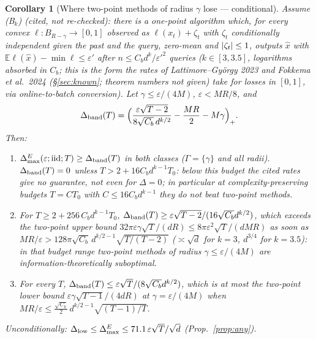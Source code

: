 \documentclass[11pt,a4paper]{article}
\numberwithin{equation}{section}
\newtheorem{corollary}[theorem]{Corollary}
\theoremstyle{definition}
\theoremstyle{remark}
\newcommand{\E}{\mathbb E}\newcommand{\R}{\mathbb R}\newcommand{\Z}{\mathbb Z}\newcommand{\Prob}{\mathbb P}
\newcommand{\Dmax}{\Delta_{\max}}\newcommand{\Dcp}{\Delta_{\rm cp}}\newcommand{\Dlow}{\Delta_{\rm low}}
\begin{document}
\begin{corollary}[Where two-point methods of radius $\gamma$ lose --- conditional]\label{cor:cross}
\emph{Assume} (B$_{k}$) (cited, not re-checked): there is a one-point algorithm which, for every convex $\ell:B_{R-\gamma}\to[0,1]$ observed as $\ell(x_t)+\zeta_t$ with $\zeta_t$ conditionally independent given the past and the query, zero-mean and $\lvert \zeta_t\rvert\le1$, outputs $\hat x$ with $\E\ell(\hat x)-\min\ell\le\varepsilon'$ after $n\le C_bd^k/\varepsilon'^2$ queries ($k\in[3,3.5]$, logarithms absorbed in $C_b$; this is the form the rates of Lattimore--Gy\"orgy 2023 and Fokkema et al.\ 2024 (\S\ref{sec:known}; theorem numbers not given) take for losses in $[0,1]$, via online-to-batch conversion). Let $\gamma\le\varepsilon/(4M)$, $\varepsilon<MR/8$, and
\[
\Delta_{\rm band}(T)=\Big(\frac{\varepsilon\sqrt{T-2}}{8\sqrt{C_b}\,d^{k/2}}-\frac{MR}2-M\gamma\Big)_+ .
\]
Then:
\begin{enumerate}[label=(\alph*)]
\item $\Dmax^E(\varepsilon;\iid;T)\ge\Delta_{\rm band}(T)$ in both classes ($\Gamma=\{\gamma\}$ and all radii). $\Delta_{\rm band}(T)=0$ unless $T>2+16C_bd^{k-1}T_0$: \emph{below this budget the cited rates give no guarantee, not even for $\Delta=0$}; in particular at complexity-preserving budgets $T=CT_0$ with $C\le16C_bd^{k-1}$ they do not beat two-point methods.
\item For $T\ge2+256\,C_bd^{k-1}T_0$, $\Delta_{\rm band}(T)\ge\varepsilon\sqrt{T-2}/(16\sqrt{C_b}d^{k/2})$, which exceeds the two-point upper bound $32\pi\varepsilon\gamma\sqrt T/(dR)\le8\pi\varepsilon^2\sqrt T/(dMR)$ as soon as $MR/\varepsilon>128\pi\sqrt{C_b}\,d^{k/2-1}\sqrt{T/(T-2)}$ ($\asymp\sqrt d$ for $k=3$, $d^{3/4}$ for $k=3.5$): in that budget range two-point methods of radius $\gamma\le\varepsilon/(4M)$ are information-theoretically suboptimal.
\item For every $T$, $\Delta_{\rm band}(T)\le\varepsilon\sqrt T/(8\sqrt{C_b}d^{k/2})$, which is at most the two-point lower bound $\varepsilon\gamma\sqrt{T-1}/(4dR)$ at $\gamma=\varepsilon/(4M)$ when $MR/\varepsilon\le\frac{\sqrt{C_b}}2\,d^{k/2-1}\sqrt{(T-1)/T}$.
\end{enumerate}
Unconditionally: $\Dlow\le\Dmax^E\le71.1\,\varepsilon\sqrt T/\sqrt d$ (Prop.~\ref{prop:any}).
\end{corollary}
\end{document}
